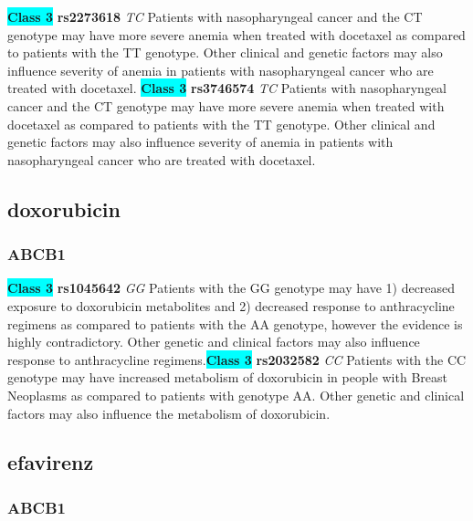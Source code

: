 \documentclass{book}
\begin{document}
\begin{center}
\textbf{\colorbox{cyan} {Class 3}} \textbf{ rs2273618 } \textit{ TC }
Patients with nasopharyngeal cancer and the CT genotype may have more severe anemia when treated with docetaxel as compared to patients with the TT genotype. Other clinical and genetic factors may also influence severity of anemia in patients with nasopharyngeal cancer who are treated with docetaxel. \textbf{\colorbox{cyan} {Class 3}} \textbf{ rs3746574 } \textit{ TC }
Patients with nasopharyngeal cancer and the CT genotype may have more severe anemia when treated with docetaxel as compared to patients with the TT genotype. Other clinical and genetic factors may also influence severity of anemia in patients with nasopharyngeal cancer who are treated with docetaxel.



\end{center}\subsection{ doxorubicin }


\subsubsection{ ABCB1 }

\begin{center}
\textbf{\colorbox{cyan} {Class 3}} \textbf{ rs1045642 } \textit{ GG }
Patients with the GG genotype may have 1) decreased exposure to doxorubicin metabolites and 2) decreased response to anthracycline regimens as compared to patients with the AA genotype, however the evidence is highly contradictory. Other genetic and clinical factors may also influence response to anthracycline regimens.\textbf{\colorbox{cyan} {Class 3}} \textbf{ rs2032582 } \textit{ CC }
Patients with the  CC genotype may have increased metabolism of doxorubicin in people with Breast Neoplasms as compared to patients with genotype AA. Other genetic and clinical factors may also influence the metabolism of doxorubicin.


\end{center}\subsection{ efavirenz }


\subsubsection{ ABCB1 }
\end{document}
